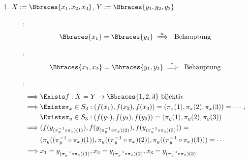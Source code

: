 \begin{solution}
\begin{enumerate}[label = \alph*.]
    \item $X := \Bbraces{x_1, x_2, x_3}$, $Y := \Bbraces{y_1, y_2, y_3}$

    \begin{itemize}

        \item
        [\Quote{$|X| = 1$}:]
        \begin{align*}
            \Bbraces{x_1} = \Bbraces{y_1}
            \stackrel{\text{a.}}{\implies}
            ~\text{Behauptung}
        \end{align*}

        \item
        [\Quote{$|X| = 2$}:]
        \begin{align*}
            \Bbraces{x_1, x_2} = \Bbraces{y_1, y_2}
            \stackrel{\text{c.}}{\implies}
            ~\text{Behauptung}
        \end{align*}

        \item
        [\Quote{$|X| = 3$}:]
        \begin{align*}
            \implies
            & \Exists f: X = Y \to \Bbraces{1, 2, 3} ~\text{bijektiv} \\
            \implies
            & \Exists \pi_x \in S_3: (f(x_1), f(x_2), f(x_3)) = (\pi_x(1), \pi_x(2), \pi_x(3)) = \cdots, \\
            & \Exists \pi_y \in S_3: (f(y_1), f(y_2), f(y_3)) = (\pi_y(1), \pi_y(2), \pi_y(3)) \\
            \implies
            & (f(y_{(\pi_y^{-1} \circ \pi_x)(1)}), f(y_{(\pi_y^{-1} \circ \pi_x)(2)}), f(y_{(\pi_y^{-1} \circ \pi_x)(3)})) = \\
            & (\pi_y((\pi_y^{-1} \circ \pi_x)(1)), \pi_y((\pi_y^{-1} \circ \pi_x)(2)), \pi_y((\pi_y^{-1} \circ \pi_x)(3))) = \cdots \\
            \implies
            & x_1 = y_{(\pi_y^{-1} \circ \pi_x)(1)}, x_2 = y_{(\pi_y^{-1} \circ \pi_x)(2)}, x_3 = y_{(\pi_y^{-1} \circ \pi_x)(3)}
        \end{align*}

    \end{itemize}
\end{enumerate}

\end{solution}

